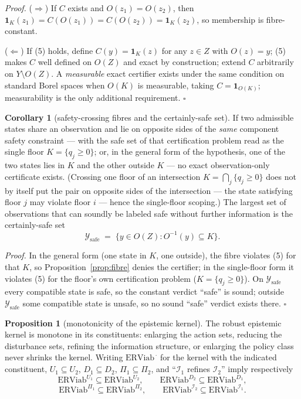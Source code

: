 \documentclass[11pt]{article}
\theoremstyle{definition}
\newtheorem{proposition}{Proposition}
\newtheorem{corollary}{Corollary}
\begin{document}
\emph{Proof.} (\(\Rightarrow\)) If \(C\) exists and \(O(z_1) = O(z_2)\),
then \(\mathbf{1}_K(z_1) = C(O(z_1)) = C(O(z_2)) = \mathbf{1}_K(z_2)\),
so membership is fibre-constant.

(\(\Leftarrow\)) If (5) holds, define \(C(y) = \mathbf{1}_K(z)\) for any
\(z \in Z\) with \(O(z) = y\); (5) makes \(C\) well defined on \(O(Z)\)
and exact by construction; extend \(C\) arbitrarily on
\(Y \setminus O(Z)\). A \emph{measurable} exact certifier exists under
the same condition on standard Borel spaces when \(O(K)\) is measurable,
taking \(C = \mathbf{1}_{O(K)}\); measurability is the only additional requirement. \ensuremath{\square}

\begin{corollary}[safety-crossing fibres and the certainly-safe set]\label{cor:certainly-safe} If two admissible states share an observation and lie on opposite
sides of the \emph{same} component safety constraint --- with the safe
set of that certification problem read as the single floor
\(K = \{ q_j \ge 0 \}\); or, in the general form of the hypothesis, one
of the two states lies in \(K\) and the other outside \(K\) --- no exact
observation-only certificate exists. (Crossing one floor of an
intersection \(K = \bigcap_j \{ q_j \ge 0 \}\) does not by itself put
the pair on opposite sides of the intersection --- the state satisfying
floor \(j\) may violate floor \(i\) --- hence the single-floor scoping.)
The largest set of observations that can soundly be labeled safe without
further information is the certainly-safe set
\[\mathcal{Y}_{\mathrm{safe}} \;=\; \big\{ y \in O(Z) : O^{-1}(y) \subseteq K \big\}.\]

\end{corollary}

\emph{Proof.} In the general form (one state in \(K\), one outside), the
fibre violates (5) for that \(K\), so Proposition~\ref{prop:fibre} denies the certifier; in
the single-floor form it violates (5) for the floor's own certification
problem (\(K = \{q_j \ge 0\}\)). On \(\mathcal{Y}_{\mathrm{safe}}\)
every compatible state is safe, so the constant verdict ``safe'' is
sound; outside \(\mathcal{Y}_{\mathrm{safe}}\) some compatible state is
unsafe, so no sound ``safe'' verdict exists there. \ensuremath{\square}

\begin{proposition}[monotonicity of the epistemic kernel]\label{prop:monotone}
The robust epistemic kernel is monotone in its constituents: enlarging
the action sets, reducing the disturbance sets, refining the information
structure, or enlarging the policy class never shrinks the kernel.
Writing \(\mathrm{ERViab}^{\,\cdot}\) for the kernel with the indicated
constituent, \(U_1\subseteq U_2\), \(D_1\subseteq D_2\),
\(\Pi_1\subseteq\Pi_2\), and ``\(\mathcal{I}_1\) refines
\(\mathcal{I}_2\)'' imply respectively
\[\mathrm{ERViab}^{U_1} \subseteq \mathrm{ERViab}^{U_2}, \qquad
\mathrm{ERViab}^{D_2} \subseteq \mathrm{ERViab}^{D_1},\]
\[\mathrm{ERViab}^{\Pi_1} \subseteq \mathrm{ERViab}^{\Pi_2}, \qquad
\mathrm{ERViab}^{\mathcal{I}_2} \subseteq \mathrm{ERViab}^{\mathcal{I}_1}.\]
\end{proposition}
\end{document}
